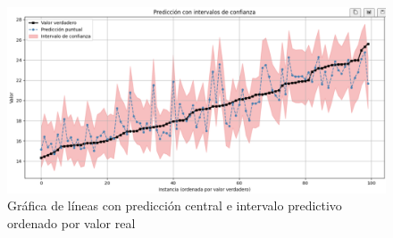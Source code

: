 \begin{figure}[h]
    \centering
    \includegraphics[width=\textwidth]{capitulos/cap_05/imagenes/conformal_prediction_sorted_by_true.png}
    \caption[
        Gráfica de líneas con predicción central e intervalo predictivo ordenado por valor real
    ]{
        Gráfica de líneas con predicción central e intervalo predictivo ordenado por valor real
    }
    \label{fig:conformal_prediction_sorted_by_true}
\end{figure}





